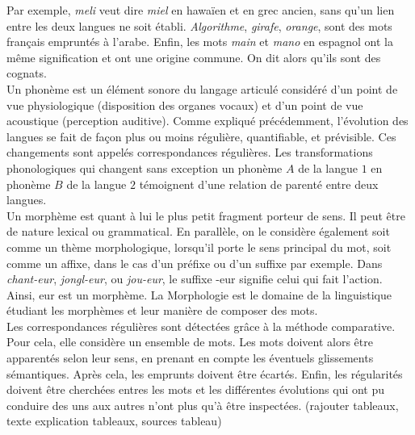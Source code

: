 \documentclass[12pt, french, twoside]{report}
\begin{document}
Par exemple, \textit{meli} veut dire \textit{miel} en hawaïen et en grec ancien, sans qu'un lien entre les deux langues ne soit établi. \textit{Algorithme}, \textit{girafe}, \textit{orange}, sont des mots français empruntés à l'arabe. Enfin, les mots \textit{main} et \textit{mano} en espagnol ont la même signification et ont une origine commune. On dit alors qu'ils sont des cognats.\\

Un phonème est un élément sonore du langage articulé considéré d'un point de vue physiologique (disposition des organes vocaux) et d'un point de vue acoustique (perception auditive). 
Comme expliqué précédemment, l'évolution des langues se fait de façon plus ou moins régulière, quantifiable, et prévisible. 
Ces changements sont appelés correspondances régulières. Les transformations phonologiques qui changent sans exception un phonème $A$ de la langue $1$ en phonème $B$ de la langue $2$ témoignent d'une relation de parenté entre deux langues.\\
\indent Un morphème est quant à lui le plus petit fragment porteur de sens. Il peut être de nature lexical ou grammatical. En parallèle, on le considère également soit comme un thème morphologique, lorsqu'il porte le sens principal du mot, soit comme un affixe, dans le cas d'un préfixe ou d'un suffixe par exemple. Dans \textit{chant-eur}, \textit{jongl-eur}, ou \textit{jou-eur}, le suffixe  \og -eur \fg{} signifie celui qui fait l'action. Ainsi, \og eur \fg{} est un morphème. La Morphologie est le domaine de la linguistique étudiant les morphèmes et leur manière de composer des mots.\\

Les correspondances régulières sont détectées grâce à la méthode comparative. Pour cela, elle considère un ensemble de mots. Les mots doivent alors être apparentés selon leur sens, en prenant en compte les éventuels glissements sémantiques. Après cela, les emprunts doivent être écartés. Enfin, les régularités doivent être cherchées entres les mots et les différentes évolutions qui ont pu conduire des uns aux autres n'ont plus qu'à être inspectées. (rajouter tableaux, texte explication tableaux, sources tableau)\\
\end{document}

